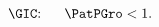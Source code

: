 \begin{equation}\begin{gathered}\begin{aligned}
    \text{\GIC:~~}  &&  \PatPGro  < 1. \phantom{/\PGro}&  \phantom{\text{\GIC:~~}} \label{eq:GICRaw}
\end{aligned}\end{gathered}\end{equation}
